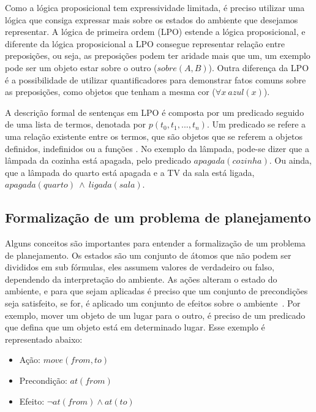 Como a lógica proposicional tem expressividade limitada, é preciso utilizar uma lógica que consiga expressar mais sobre os estados do ambiente que desejamos representar. 
A lógica de primeira ordem (LPO) estende a lógica proposicional, e diferente da lógica proposicional a LPO consegue representar relação entre preposições, ou seja, as preposições podem ter aridade mais que um, um exemplo pode ser um objeto estar sobre o outro ($sobre(A,B)$). Outra diferença da LPO é a possibilidade de utilizar quantificadores para demonstrar fatos comuns sobre as preposições, como objetos que tenham a mesma cor ($\forall x~ azul(x)$).

A descrição formal de sentenças em LPO é composta por um predicado seguido de uma lista de termos, denotada por $p(t_{0}, t_{1}, ..., t_{n})$. 
Um predicado se refere a uma relação existente entre os termos, que são objetos que se referem a objetos definidos, indefinidos ou a funções \cite[Capítulo 10]{intelligence2003modern}. 
No exemplo da lâmpada, pode-se dizer que a lâmpada da cozinha está apagada, pelo predicado $apagada(cozinha)$. 
Ou ainda, que a lâmpada do quarto está apagada e a TV da sala está ligada, $apagada(quarto)~ \wedge~ ligada(sala)$.  

\subsection{Formalização de um problema de planejamento}
\label{subsec:classicalPlanningForm}

Alguns conceitos são importantes para entender a formalização de um problema de planejamento. 
Os estados são um conjunto de átomos que não podem ser divididos em sub fórmulas, eles assumem valores de verdadeiro ou falso, dependendo da interpretação do ambiente.
As ações alteram o estado do ambiente, e para que sejam aplicadas é preciso que um conjunto de precondições seja satisfeito, se for, é aplicado um conjunto de efeitos sobre o ambiente~\cite[Capítulo 10]{intelligence2003modern}.
Por exemplo, mover um objeto de um lugar para o outro, é preciso de um predicado que defina que um objeto está em determinado lugar. Esse exemplo é representado abaixo:

\begin{itemize}
	\item Ação: $move(from, to)$
	\item Precondição: $at(from)$
	\item Efeito: $\neg at(from) \wedge at(to)$
\end{itemize}

